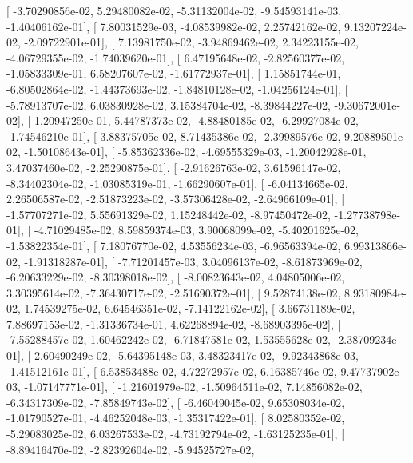 \documentclass{article}
\begin{document}
       [ -3.70290856e-02,   5.29480082e-02,  -5.31132004e-02,
         -9.54593141e-03,  -1.40406162e-01],
       [  7.80031529e-03,  -4.08539982e-02,   2.25742162e-02,
          9.13207224e-02,  -2.09722901e-01],
       [  7.13981750e-02,  -3.94869462e-02,   2.34223155e-02,
         -4.06729355e-02,  -1.74039620e-01],
       [  6.47195648e-02,  -2.82560377e-02,  -1.05833309e-01,
          6.58207607e-02,  -1.61772937e-01],
       [  1.15851744e-01,  -6.80502864e-02,  -1.44373693e-02,
         -1.84810128e-02,  -1.04256124e-01],
       [ -5.78913707e-02,   6.03830928e-02,   3.15384704e-02,
         -8.39844227e-02,  -9.30672001e-02],
       [  1.20947250e-01,   5.44787373e-02,  -4.88480185e-02,
         -6.29927084e-02,  -1.74546210e-01],
       [  3.88375705e-02,   8.71435386e-02,  -2.39989576e-02,
          9.20889501e-02,  -1.50108643e-01],
       [ -5.85362336e-02,  -4.69555329e-03,  -1.20042928e-01,
          3.47037460e-02,  -2.25290875e-01],
       [ -2.91626763e-02,   3.61596147e-02,  -8.34402304e-02,
         -1.03085319e-01,  -1.66290607e-01],
       [ -6.04134665e-02,   2.26506587e-02,  -2.51873223e-02,
         -3.57306428e-02,  -2.64966109e-01],
       [ -1.57707271e-02,   5.55691329e-02,   1.15248442e-02,
         -8.97450472e-02,  -1.27738798e-01],
       [ -4.71029485e-02,   8.59859374e-03,   3.90068099e-02,
         -5.40201625e-02,  -1.53822354e-01],
       [  7.18076770e-02,   4.53556234e-03,  -6.96563394e-02,
          6.99313866e-02,  -1.91318287e-01],
       [ -7.71201457e-03,   3.04096137e-02,  -8.61873969e-02,
         -6.20633229e-02,  -8.30398018e-02],
       [ -8.00823643e-02,   4.04805006e-02,   3.30395614e-02,
         -7.36430717e-02,  -2.51690372e-01],
       [  9.52874138e-02,   8.93180984e-02,   1.74539275e-02,
          6.64546351e-02,  -7.14122162e-02],
       [  3.66731189e-02,   7.88697153e-02,  -1.31336734e-01,
          4.62268894e-02,  -8.68903395e-02],
       [ -7.55288457e-02,   1.60462242e-02,  -6.71847581e-02,
          1.53555628e-02,  -2.38709234e-01],
       [  2.60490249e-02,  -5.64395148e-03,   3.48323417e-02,
         -9.92343868e-03,  -1.41512161e-01],
       [  6.53853488e-02,   4.72272957e-02,   6.16385746e-02,
          9.47737902e-03,  -1.07147771e-01],
       [ -1.21601979e-02,  -1.50964511e-02,   7.14856082e-02,
         -6.34317309e-02,  -7.85849743e-02],
       [ -6.46049045e-02,   9.65308034e-02,  -1.01790527e-01,
         -4.46252048e-03,  -1.35317422e-01],
       [  8.02580352e-02,  -5.29083025e-02,   6.03267533e-02,
         -4.73192794e-02,  -1.63125235e-01],
       [ -8.89416470e-02,  -2.82392604e-02,  -5.94525727e-02,
\end{document}
